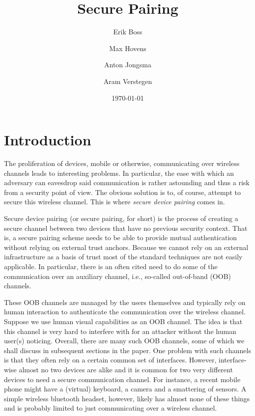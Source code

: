 \documentclass[conference, 11pt]{sty/IEEEtran}
\title{Secure Pairing}
\author{Erik Boss \and Max Hovens \and Anton Jongsma \and Aram Verstegen}
\date{\today}
\begin{document}
\maketitle

\begin{abstract}
    
\end{abstract}

\section{Introduction}
\label{sec:introduction}

The proliferation of devices, mobile or otherwise, communicating over wireless channels leads to interesting problems.
In particular, the ease with which an adversary can eavesdrop said communication is rather astounding and thus a risk from a security point of view.
The obvious solution is to, of course, attempt to secure this wireless channel.
This is where \emph{secure device pairing} comes in.

Secure device pairing (or secure pairing, for short) is the process of creating a secure channel between two devices that have no previous security context.
That is, a secure pairing scheme needs to be able to provide mutual authentication without relying on external trust anchors.
Because we cannot rely on an external infrastructure as a basis of trust most of the standard techniques are not easily applicable.
In particular, there is an often cited need to do some of the communication over an auxiliary channel, i.e., so-called out-of-band (OOB) channels.

These OOB channels are managed by the users themselves and typically rely on human interaction to authenticate the communication over the wireless channel.
Suppose we use human visual capabilities as an OOB channel.
The idea is that this channel is very hard to interfere with for an attacker without the human user(s) noticing.
Overall, there are many such OOB channels, some of which we shall discuss in subsequent sections in the paper.
One problem with such channels is that they often rely on a certain common set of interfaces.
However, interface-wise almost no two devices are alike and it is common for two very different devices to need a secure communication channel.
For instance, a recent mobile phone might have a (virtual) keyboard, a camera and a smattering of sensors.
A simple wireless bluetooth headset, however, likely has almost none of these things and is probably limited to just communicating over a wireless channel.
\end{document}
